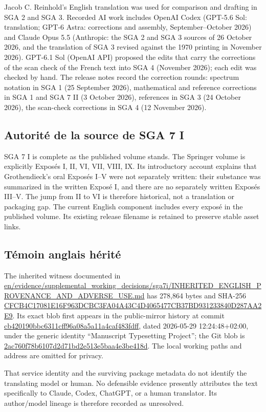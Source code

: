 Jacob C. Reinhold's English translation was used for comparison and drafting in SGA 2 and SGA 3. Recorded AI work includes OpenAI Codex (GPT-5.6 Sol: translation; GPT-6 Astra: corrections and assembly, September–October 2026) and Claude Opus 5.5 (Anthropic: the SGA 2 and SGA 3 sources of 26 October 2026, and the translation of SGA 3 revised against the 1970 printing in November 2026). GPT-6.1 Sol (OpenAI API) proposed the edits that carry the corrections of the scan check of the French text into SGA 4 (November 2026); each edit was checked by hand. The release notes record the correction rounds: spectrum notation in SGA 1 (25 September 2026), mathematical and reference corrections in SGA 1 and SGA 7 II (3 October 2026), references in SGA 3 (24 October 2026), the scan-check corrections in SGA 4 (12 November 2026).


\subsection*{Autorité de la source de SGA 7 I}

SGA 7 I is complete as the published volume stands. The Springer volume is explicitly Exposés I, II, VI, VII, VIII, IX. Its introductory account explains that Grothendieck's oral Exposés I–V were not separately written: their substance was summarized in the written Exposé I, and there are no separately written Exposés III–V. The jump from II to VI is therefore historical, not a translation or packaging gap. The current English component includes every exposé in the published volume. Its existing release filename is retained to preserve stable asset links.


\subsection*{Témoin anglais hérité}

The inherited witness documented in \url{en/evidence/supplemental_working_decisions/sga7i/INHERITED_ENGLISH_PROVENANCE_AND_ADVERSE_USE.md} has 278,864 bytes and SHA-256 \url{CFCB4C17081E16F963DCBC3FA04A43C4D4065477CB37BD931233840D287AA2E9}. Its exact blob first appears in the public-mirror history at commit \url{cb420190bbc6311cff96a08a5a11a4caf483fdff}, dated 2026-05-29 12:24:48+02:00, under the generic identity “Manuscript Typesetting Project”; the Git blob is \url{2ac760f78b6107d2d71bd2e513e5baa4e3be418d}. The local working paths and address are omitted for privacy.

That service identity and the surviving package metadata do not identify the translating model or human. No defensible evidence presently attributes the text specifically to Claude, Codex, ChatGPT, or a human translator. Its author/model lineage is therefore recorded as unresolved.

